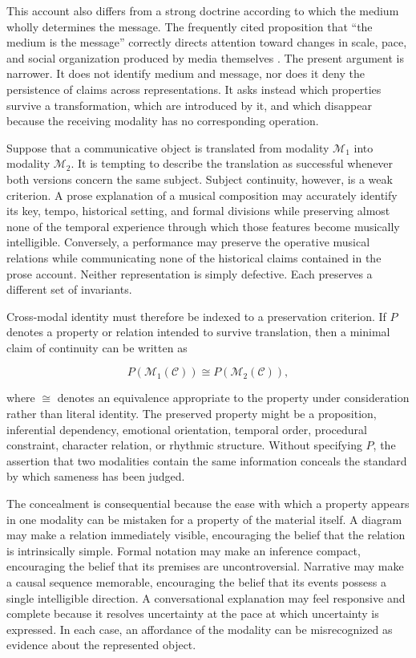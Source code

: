 \documentclass[11pt]{article}
\newcommand{\modality}{\mathcal{M}}
\newcommand{\contentobj}{\mathcal{C}}
\begin{document}
This account also differs from a strong doctrine according to which the
medium wholly determines the message. The frequently cited proposition that
``the medium is the message'' correctly directs attention toward changes in
scale, pace, and social organization produced by media themselves
\citep{mcluhan1964}. The present argument is narrower. It does not identify
medium and message, nor does it deny the persistence of claims across
representations. It asks instead which properties survive a transformation,
which are introduced by it, and which disappear because the receiving
modality has no corresponding operation.

Suppose that a communicative object is translated from modality
\(\modality_1\) into modality \(\modality_2\). It is tempting to describe the
translation as successful whenever both versions concern the same subject.
Subject continuity, however, is a weak criterion. A prose explanation of a
musical composition may accurately identify its key, tempo, historical
setting, and formal divisions while preserving almost none of the temporal
experience through which those features become musically intelligible.
Conversely, a performance may preserve the operative musical relations while
communicating none of the historical claims contained in the prose account.
Neither representation is simply defective. Each preserves a different set
of invariants.

Cross-modal identity must therefore be indexed to a preservation criterion.
If \(P\) denotes a property or relation intended to survive translation, then
a minimal claim of continuity can be written as

\begin{equation}
  P\!\left(\modality_1(\contentobj)\right)
  \cong
  P\!\left(\modality_2(\contentobj)\right),
  \label{eq:modal-invariant}
\end{equation}

where \(\cong\) denotes an equivalence appropriate to the property under
consideration rather than literal identity. The preserved property might be a
proposition, inferential dependency, emotional orientation, temporal order,
procedural constraint, character relation, or rhythmic structure. Without
specifying \(P\), the assertion that two modalities contain the same
information conceals the standard by which sameness has been judged.

The concealment is consequential because the ease with which a property
appears in one modality can be mistaken for a property of the material
itself. A diagram may make a relation immediately visible, encouraging the
belief that the relation is intrinsically simple. Formal notation may make an
inference compact, encouraging the belief that its premises are
uncontroversial. Narrative may make a causal sequence memorable, encouraging
the belief that its events possess a single intelligible direction. A
conversational explanation may feel responsive and complete because it
resolves uncertainty at the pace at which uncertainty is expressed. In each
case, an affordance of the modality can be misrecognized as evidence about
the represented object.
\end{document}
